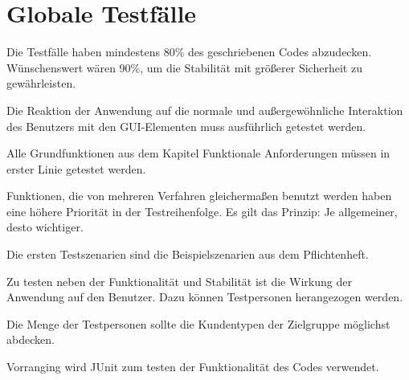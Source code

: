 \documentclass{article}
\begin{document}
\section{Globale Testfälle}
\begin{T}[start = 10]
\item Die Testfälle haben mindestens 80\% des geschriebenen Codes abzudecken. Wünschenswert wären 90\%,
      um die Stabilität mit größerer Sicherheit zu gewährleisten.
\end{T}

\begin{T}[start = 10]
 \item Die Reaktion der Anwendung auf die normale und außergewöhnliche Interaktion des Benutzers mit 
       den GUI-Elementen muss ausführlich getestet werden.
\end{T}

\begin{T}[start = 10]
 \item Alle Grundfunktionen aus dem Kapitel Funktionale Anforderungen müssen in erster Linie getestet werden.
\end{T}

\begin{T}[start = 10]
 \item Funktionen, die von mehreren Verfahren gleichermaßen benutzt werden haben eine höhere Priorität in der Testreihenfolge.
       Es gilt das Prinzip: Je allgemeiner, desto wichtiger.
\end{T}

\begin{T}[start = 10]
 \item Die ersten Testszenarien sind die Beispielszenarien aus dem Pflichtenheft.
\end{T}

\begin{T}[start = 10]
 \item Zu testen neben der Funktionalität und Stabilität ist die Wirkung der Anwendung auf den Benutzer. 
       Dazu können Testpersonen herangezogen werden.
\end{T}

\begin{T}[start = 10]
 \item Die Menge der Testpersonen sollte die Kundentypen der Zielgruppe möglichst abdecken.
\end{T}

\begin{T}[start = 10]
 \item Vorranging wird JUnit zum testen der Funktionalität des Codes verwendet.
\end{T}
\end{document}
